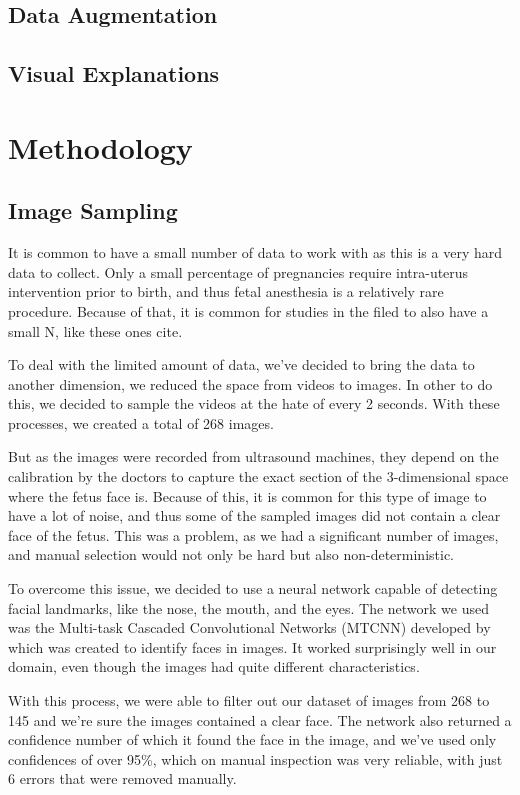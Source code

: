 \subsection{Data Augmentation}

\subsection{Visual Explanations}

\section{Methodology}

\subsection{Image Sampling}

It is common to have a small number of data to work with as this is a very hard data to collect. Only a small percentage of pregnancies require intra-uterus intervention prior to birth, and thus fetal anesthesia is a relatively rare procedure. Because of that, it is common for studies in the filed to also have a small N, like these ones cite{}.

To deal with the limited amount of data, we've decided to bring the data to another dimension, we reduced the space from videos to images. In other to do this, we decided to sample the videos at the hate of every 2 seconds. With these processes, we created a total of 268 images.

But as the images were recorded from ultrasound machines, they depend on the calibration by the doctors to capture the exact section of the 3-dimensional space where the fetus face is. Because of this, it is common for this type of image to have a lot of noise, and thus some of the sampled images did not contain a clear face of the fetus. This was a problem, as we had a significant number of images, and manual selection would not only be hard but also non-deterministic.

To overcome this issue, we decided to use a neural network capable of detecting facial landmarks, like the nose, the mouth, and the eyes. The network we used was the Multi-task Cascaded Convolutional Networks (MTCNN) developed by \cite{ZhangZL016} which was created to identify faces in images. It worked surprisingly well in our domain, even though the images had quite different characteristics.

With this process, we were able to filter out our dataset of images from 268 to 145 and we're sure the images contained a clear face. The network also returned a confidence number of which it found the face in the image, and we've used only confidences of over 95\%, which on manual inspection was very reliable, with just 6 errors that were removed manually.

